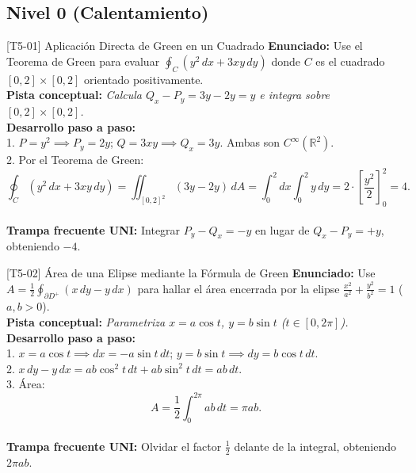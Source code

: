 \documentclass[11pt,a4paper]{article}
\begin{document}
\subsection{Nivel 0 (Calentamiento)}

\begin{ejerciciobox}{[T5-01] Aplicación Directa de Green en un Cuadrado}
\textbf{Enunciado:} Use el Teorema de Green para evaluar $\oint_C (y^2\,dx + 3xy\,dy)$ donde $C$ es el cuadrado $[0,2]\times[0,2]$ orientado positivamente.\\[0.2cm]
\textbf{Pista conceptual:} \emph{Calcula $Q_x - P_y = 3y - 2y = y$ e integra sobre $[0,2]\times[0,2]$.}\\[0.2cm]
\textbf{Desarrollo paso a paso:}\\
1. $P = y^2 \implies P_y = 2y$; $Q = 3xy \implies Q_x = 3y$. Ambas son $C^\infty(\mathbb{R}^2)$.\\
2. Por el Teorema de Green:\\
$$\oint_C (y^2\,dx + 3xy\,dy) = \iint_{[0,2]^2} (3y - 2y)\,dA = \int_0^2 dx \int_0^2 y\,dy = 2\cdot\left[\frac{y^2}{2}\right]_0^2 = 4.$$\\[0.2cm]
\textbf{Trampa frecuente UNI:} Integrar $P_y - Q_x = -y$ en lugar de $Q_x - P_y = +y$, obteniendo $-4$.
\end{ejerciciobox}

\begin{ejerciciobox}{[T5-02] Área de una Elipse mediante la Fórmula de Green}
\textbf{Enunciado:} Use $A = \frac{1}{2}\oint_{\partial D^+} (x\,dy - y\,dx)$ para hallar el área encerrada por la elipse $\frac{x^2}{a^2} + \frac{y^2}{b^2} = 1$ ($a, b > 0$).\\[0.2cm]
\textbf{Pista conceptual:} \emph{Parametriza $x = a\cos t$, $y = b\sin t$ ($t \in [0, 2\pi]$).}\\[0.2cm]
\textbf{Desarrollo paso a paso:}\\
1. $x = a\cos t \implies dx = -a\sin t\,dt$; $y = b\sin t \implies dy = b\cos t\,dt$.\\
2. $x\,dy - y\,dx = ab\cos^2 t\,dt + ab\sin^2 t\,dt = ab\,dt$.\\
3. Área:\\
$$A = \frac{1}{2}\int_0^{2\pi} ab\,dt = \pi a b.$$\\[0.2cm]
\textbf{Trampa frecuente UNI:} Olvidar el factor $\frac{1}{2}$ delante de la integral, obteniendo $2\pi ab$.
\end{ejerciciobox}
\end{document}
